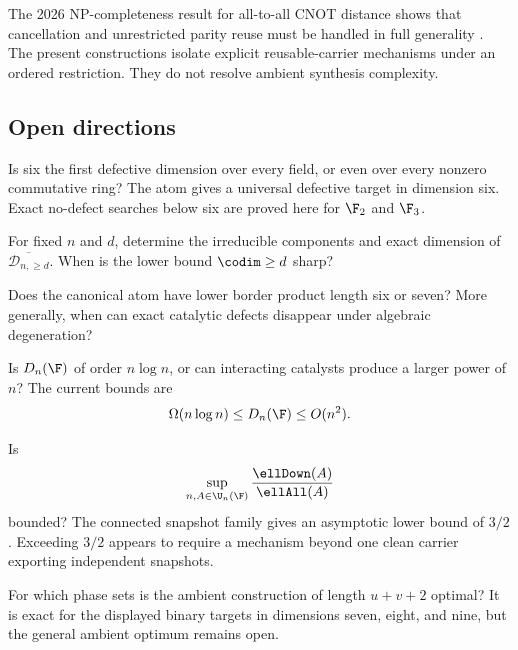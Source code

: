 The 2026 NP-completeness result for all-to-all CNOT distance shows that cancellation and unrestricted parity reuse must be handled in full generality \cite{AcuavivaEtAl2026}.  The present constructions isolate explicit reusable-carrier mechanisms under an ordered restriction.  They do not resolve ambient synthesis complexity.

\subsection{Open directions}

\begin{question}
Is six the first defective dimension over every field, or even over every nonzero commutative ring?  The atom gives a universal defective target in dimension six.  Exact no-defect searches below six are proved here for $\F_2$ and $\F_3$.
\end{question}

\begin{question}
For fixed $n$ and $d$, determine the irreducible components and exact dimension of $\overline{\mathcal D_{n,\ge d}}$.  When is the lower bound $\codim\ge d$ sharp?
\end{question}

\begin{question}
Does the canonical atom have lower border product length six or seven?  More generally, when can exact catalytic defects disappear under algebraic degeneration?
\end{question}

\begin{question}
Is $D_n(\F)$ of order $n\log n$, or can interacting catalysts produce a larger power of $n$?  The current bounds are
\[
\Omega(n\log n)
\le
D_n(\F)
\le
O(n^2).
\]
\end{question}

\begin{question}
Is
\[
\sup_{n,A\in\U_n(\F)}
\frac{\ellDown(A)}{\ellAll(A)}
\]
bounded?  The connected snapshot family gives an asymptotic lower bound of $3/2$.  Exceeding $3/2$ appears to require a mechanism beyond one clean carrier exporting independent snapshots.
\end{question}

\begin{question}
For which phase sets is the ambient construction of length $u+v+2$ optimal?  It is exact for the displayed binary targets in dimensions seven, eight, and nine, but the general ambient optimum remains open.
\end{question}

